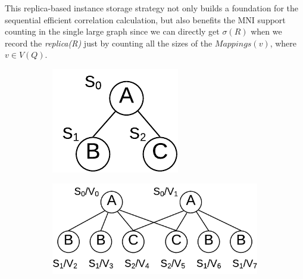 This replica-based instance storage strategy not only builds a foundation for the sequential
efficient correlation calculation, but also benefits the MNI support counting in
the single large graph since we can directly get $\sigma(R)$ when we record the
\textit{replica(R)} just by counting all the sizes of the $Mappings(v)$, where $v\in
V(Q)$.




\begin{figure}
	\begin{subfigure}[b]{0.15\textwidth}
            \includegraphics[scale=0.6]{img_ex/Exact-Q.pdf}
            \caption{}
			\label{fig:exactq}
    \end{subfigure}%
	\begin{subfigure}[b]{0.35\textwidth}
            \includegraphics[scale=0.6]{img_ex/Exact-rep(Q).pdf}

\end{subfigure}
\end{figure}
